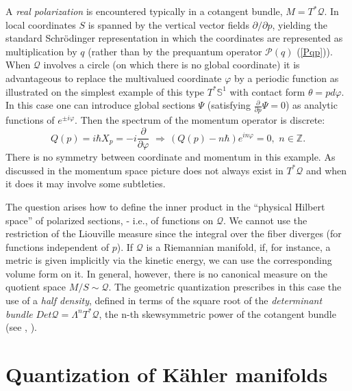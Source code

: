 \documentclass[12pt]{article}
\begin{document}
A {\it real polarization} is encountered typically in a cotangent bundle,
$M = T^*{\mathcal Q}$. In local coordinates $S$ is
spanned by the vertical vector fields $\partial/\partial p$, yielding the
standard Schr\"odinger representation in which
the coordinates are represented as multiplication by $q$ (rather than by the
prequantum operator ${\mathcal P} (q)$ (\ref{Pqp})). When ${\mathcal Q}$ involves a circle
(on which there is no global coordinate) it is advantageous to replace the 
multivalued coordinate $\varphi$ by a periodic function as illustrated on the
simplest example of this type $T^*{\mathbb S}^1$ with contact form $\theta =
pd\varphi$. In this case one can introduce global sections $\Psi$ (satisfying 
$\frac{\partial}{\partial p} \Psi =0$) as analytic functions of $e^{\pm i\varphi}$. Then 
the spectrum of the momentum operator is discrete:
\begin{equation}
\label{pS1}
Q(p) = i\hbar X_p  = -i\frac{\partial}{\partial \varphi} \, \, \Rightarrow
\, (Q(p) - n\hbar) e^{in\varphi} = 0, \, \, n\in{\mathbb Z}.
\end{equation}
There is no symmetry between coordinate and momentum in this example.
 As discussed in \cite{B} the momentum space picture does not always exist 
in $T^*{\mathcal Q}$ and when it does it may involve some subtleties.

The question arises how to define the inner product in the ``physical Hilbert
space'' of polarized sections, - i.e., of functions on ${\mathcal Q}$. We cannot
 use the restriction of the Liouville measure since the integral over the fiber
 diverges (for functions independent of $p$). If ${\mathcal Q}$ is a Riemannian 
manifold, if, for instance, a metric is given implicitly via 
the kinetic energy, we can use the corresponding volume form on it. In general,
however, there is no canonical measure on the quotient space $M/S \sim{\mathcal Q}$. 
The geometric quantization prescribes in this case the use of a {\it half density}, 
defined in terms of the square root of the {\it determinant bundle} $Det{\mathcal Q}
= \Lambda^n T^*{\mathcal Q}$, the n-th skewsymmetric power of the cotangent bundle 
(see \cite{AE}, \cite{B}).

\bigskip

\section{Quantization of K{\"a}hler manifolds}
\setcounter{equation}{0}
\renewcommand\theequation{\thesection.\arabic{equation}}
\end{document}
